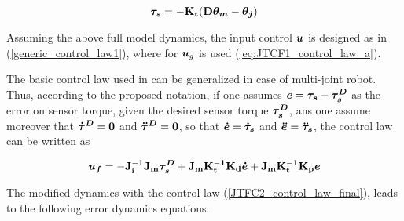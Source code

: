 \begin{equation}
\label{dynamic_model_modifiedHashimoto_3}
\vects{\tau_s} = -\vectm{K_t} (\vectm{D}\vects{{\theta}_m} - \vects{\theta_j})
\end{equation}


Assuming the above full model dynamics, the input control ${ \boldsymbol {u}}$ is designed as in (\ref{generic_control_law1}), where for ${ \boldsymbol {u}}_g$ is used (\ref{eq:JTCF1_control_law_a}).
%
%
%

The basic control law used in \cite{hashimoto1998experimental} can be generalized in case of multi-joint robot. Thus, according to the  proposed notation, if one assumes  ${ \boldsymbol {e}}={ \boldsymbol {\tau_s}}-{ \boldsymbol {\tau_s^D}}$ as the error on sensor torque, given the desired sensor torque  ${ \boldsymbol {\tau_s^D}}$, ans one assume moreover that ${ \boldsymbol {\dot{\tau}^D}}={ \boldsymbol {0}}$ and  ${ \boldsymbol {\ddot{\tau}^D}}={ \boldsymbol {0}}$, so that 
${ \boldsymbol {\dot{e}}}={ \boldsymbol {\dot{\tau}_s}}$ and  ${ \boldsymbol {\ddot{e}}}={ \boldsymbol {\ddot{\tau}_s}}$, the control law can be written as

\setlength{\arraycolsep}{0.0em}
\begin{equation}
\label{JTFC2_control_law_final}
\vects{u_f} = - \vectm{J^{-1}_i} \vectm{J_m} \vects{\tau^D_s} + \vectm{J_m} \vectm{K^{-1}_t} \vectm{K_d} \vects{\dot{e}} + \vectm{J_m} \vectm{K^{-1}_t} \vectm{K_p} \vects{e} 
\end{equation}
\setlength{\arraycolsep}{5pt}

The modified dynamics with the control law  (\ref{JTFC2_control_law_final}), leads to the following error dynamics equations:

